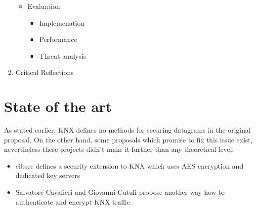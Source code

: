 \documentclass[a4paper,12pt,twoside]{memoir}
\begin{document}
\begin{enumerate}
\begin{itemize}
    \item Evaluation
  \begin{itemize}
    \item Implemenation 
    \item Performance
    \item Threat analysis
  \end{itemize}
  \end{itemize}
  
  
 
  \item Critical Reflections

\end{enumerate}
  
\section{State of the art}

As stated earlier, KNX defines no methods for securing datagrams in the original proposal.
On the other hand, some proposals which promise to fix this issue exist, nevertheless these projects didn't
make it further than any theoretical level:

\begin{itemize}
 \item {eibsec}\cite{WG2006d} defines a security extension to KNX which uses AES encryption and dedicated key
servers
 \item Salvatore Cavalieri and Giovanni Cutuli\cite{knxsec} propose another way how to authenticate and
 encrypt KNX traffic.
\end{itemize}
\end{document}
